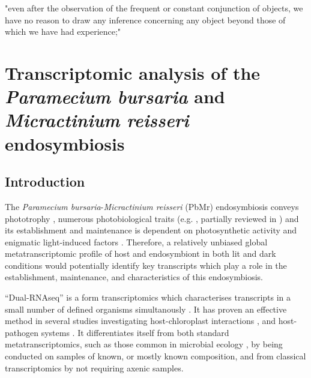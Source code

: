 \graphicspath{{chapters/4.Chapter2/figures/}}

\begin{savequote}[75mm]
"even after the observation of the frequent or constant conjunction of objects, we have no reason to draw any inference concerning any object beyond those of which we have had experience;"
\end{savequote}





\chapter{Transcriptomic analysis of the \textit{Paramecium bursaria} and \textit{Micractinium reisseri} endosymbiosis}

\section{Introduction}

The \textit{Paramecium bursaria}-\textit{Micractinium reisseri} (PbMr) endosymbiosis 
conveys phototrophy \citep{Karakashian1963}, numerous photobiological traits (e.g. \citep{Berk1991,Saji1974,Nakajima1989,Niess1982a,Iwatsuki1988,Summerer2009}, 
partially reviewed in \citep{Sommaruga2009}) and its establishment and maintenance 
is dependent on photosynthetic activity and enigmatic light-induced factors \citep{Karakashian1963,Hosoya1995a,Kodama2007,Kodama2014c}.
Therefore, a relatively unbiased global metatranscriptomic profile of host and endosymbiont in both lit and dark conditions 
would potentially identify key transcripts which play a role in the establishment, maintenance, and characteristics 
of this endosymbiosis. 


``Dual-RNAseq'' is a form transcriptomics which characterises transcripts in a small number of defined organisms simultanously \citep{Westermann2012}.
It has proven an effective method in several studies investigating host-chloroplast interactions \citep{Nowack2011,Jiggins2013,Xiang2015},
and host-pathogen systems \citep{Tieryney2012,Kawahara2012,Jones2014,Hayden2014}.
It differentiates itself from both standard metatranscriptomics, such as those common in microbial ecology \citep{Poretsky2005,AliagaGoltsman2014},
by being conducted on samples of known, or mostly known composition, and from classical transcriptomics
by not requiring axenic samples. 


